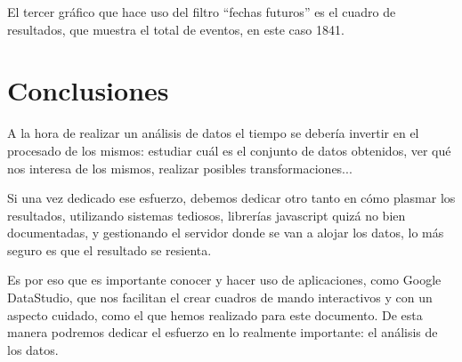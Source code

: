 \documentclass{\ClassPath/viu-tfm-template}
\begin{document}
El tercer gráfico que hace uso del filtro “fechas futuros” es el cuadro de resultados, que muestra el total de eventos, en este caso 1841.


\chapter{Conclusiones}

A la hora de realizar un análisis de datos el tiempo se debería invertir en el procesado de los mismos: estudiar cuál es el conjunto de datos obtenidos, ver qué nos interesa de los mismos, realizar posibles transformaciones...

Si una vez dedicado ese esfuerzo, debemos dedicar otro tanto en cómo plasmar los resultados, utilizando sistemas tediosos, librerías javascript quizá no bien documentadas, y gestionando el servidor donde se van a alojar los datos, lo más seguro es que el resultado se resienta.

Es por eso que es importante conocer y hacer uso de aplicaciones, como Google DataStudio, que nos facilitan el crear cuadros de mando interactivos y con un aspecto cuidado, como el que hemos realizado para este documento. De esta manera   podremos dedicar el esfuerzo en lo realmente importante: el análisis de los datos.
\end{document}
